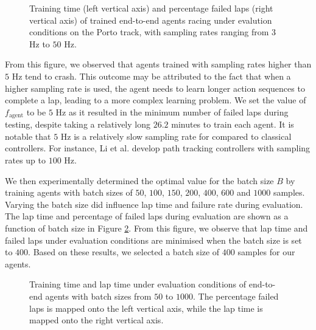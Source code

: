 \begin{figure}[htb!]
    \centering
    
    \caption[Training time and percentage failed laps under evaluation conditions of end-to-end agents with various sampling rates]{Training time (left vertical axis) and percentage failed laps (right vertical axis) of trained end-to-end agents racing under evalution conditions on the Porto track, with sampling rates ranging from $3$ Hz to $50$ Hz.}
    \label{fig:f_agent}
\end{figure}

From this figure, we observed that agents trained with sampling rates higher than $5$ Hz tend to crash.
This outcome may be attributed to the fact that when a higher sampling rate is used, the agent needs to learn longer action sequences to complete a lap, leading to a more complex learning problem. 
We set the value of $f_{\text{agent}}$ to be $5$ Hz as it resulted in the minimum number of failed laps during testing, despite taking a relatively long $26.2$ minutes to train each agent.
It is notable that $5$ Hz is a relatively slow sampling rate for compared to classical controllers.
For instance, Li et al. \cite{Li2019} develop path tracking controllers with sampling rates up to $100$ Hz.


We then experimentally determined the optimal value for the batch size $B$ by training agents with batch sizes of $50$, $100$, $150$, $200$, $400$, $600$ and $1000$ samples.
Varying the batch size did influence lap time and failure rate during evaluation.
The lap time and percentage of failed laps during evaluation are shown as a function of batch size in Figure \ref{fig:batch_size}.
From this figure, we observe that lap time and failed laps under evaluation conditions are minimised when the batch size is set to $400$.
Based on these results, we selected a batch size of $400$ samples for our agents.

\begin{figure}[htb!]
    \centering
    
    \caption[Training time and lap time under evaluation conditions of end-to-end agents with various batch sizes]{Training time and lap time under evaluation conditions of end-to-end agents with batch sizes from $50$ to $1000$. The percentage failed laps is mapped onto the left vertical axis, while the lap time is mapped onto the right vertical axis.}
    \label{fig:batch_size}
\end{figure}


